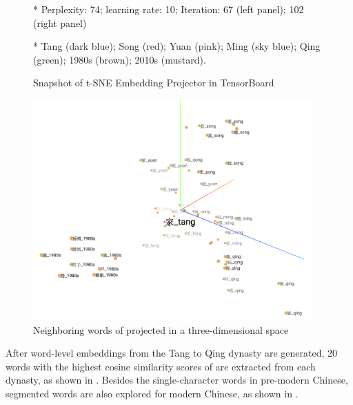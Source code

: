 \begin{figure}[H]
\begin{threeparttable}
\begin{minipage}[b]{0.45\linewidth}
  \end{minipage}
    \begin{tablenotes}
      \linespread{1}\footnotesize
      \item[*]\hspace*{-\fontdimen2\font}Perplexity: 74; learning rate: 10; Iteration: 67 (left panel); 102 (right panel)
      \item[*]\hspace*{-\fontdimen2\font}Tang (dark blue); Song (red); Yuan (pink); Ming (sky blue); Qing (green); 1980s (brown); 2010s (mustard).
    \end{tablenotes}
  \end{threeparttable}
  \caption{Snapshot of t-SNE Embedding Projector in TensorBoard} \label{fig:tensorboard_tSNE}
\end{figure}

\begin{figure}[H]
  \centering
  \includegraphics[height=0.475\textheight,width=0.95\textwidth,keepaspectratio]{figures_new/from_old/jia_neighboring_words}
  \caption{Neighboring words of \jia projected in a three-dimensional space} \label{fig:tensorboard_jia}
\end{figure}

After word-level embeddings from the Tang to Qing dynasty are generated, 20 words with the highest cosine similarity scores of \jia are extracted from each dynasty, as shown in . Besides the single-character words in pre-modern Chinese, segmented words are also explored for modern Chinese, as shown in .

